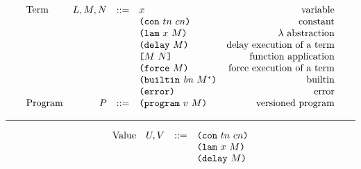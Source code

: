 \documentclass[../plutus-core-specification.tex]{subfiles}
\begin{document}
\begin{minipage}{\linewidth}
    \centering
    \[\begin{array}{lrclr}
    \textrm{Term}       & L,M,N  & ::= & x                      & \textrm{variable}\\
                        &        &     & \texttt{(} \texttt{con} ~ tn ~ cn \texttt{)}               & \textrm{constant}\\
                        &        &     & \texttt{(} \texttt{lam} ~ x ~ M  \texttt{)}            & \textrm{$\lambda$ abstraction}\\
                        &        &     & \texttt{(} \texttt{delay} ~ M \texttt{)}              & \textrm{delay execution of a term}\\
                        &        &     & \texttt{[} M ~ N \texttt{]}            & \textrm{function application}\\
                        &        &     & \texttt{(} \texttt{force} ~ M \texttt{)}              & \textrm{force execution of a term}\\
                        &        &     & \texttt{(} \texttt{builtin} ~ \mathit{bn} ~ M^* \texttt{)}     & \textrm{builtin}\\
                        &        &     & \texttt{(} \texttt{error} \texttt{)}                & \textrm{error}\\
        \textrm{Program}& P      & ::= & \texttt{(} \texttt{program} ~ v ~ M \texttt{)}         & \textrm{versioned program}

    \end{array}\]
    \label{fig:untyped-grammar}
\end{minipage}

\medskip\hrule\medskip

\begin{minipage}{\linewidth}
    \centering
    \[\begin{array}{lrcl}
        \textrm{Value}  & U, V   & ::= & \texttt{(} \texttt{con} ~ tn ~ cn \texttt{)}    \\
                        &        &     & \texttt{(} \texttt{lam} ~ x ~ M  \texttt{)} \\
                        &        &     & \texttt{(} \texttt{delay} ~ M \texttt{)}   
    \end{array}\]
    \label{fig:untyped-values}
\end{minipage}
\end{document}
